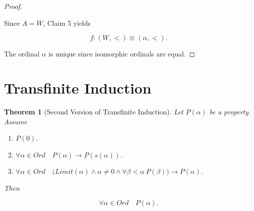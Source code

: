\documentclass[10pt,a4paper]{book}
\newtheorem{theorem}{Theorem}[section]
\begin{document}
\begin{proof}
\begin{fitchproof}[arrayenv=tabular]
        \open
         
         
         
         
        \close


    \end{fitchproof}

    Since $A=W$, Claim 5 yields

    \[
        f:(W,<)\cong(\alpha,<).
    \]

    The ordinal $\alpha$ is unique since isomorphic ordinals are equal.

\end{proof}

\section{Transfinite Induction}

\begin{theorem}[Second Version of Transfinite Induction]

    Let $P(\alpha)$ be a property. Assume

    \begin{enumerate}
        \setlength{\itemsep}{0pt}
        \item $P(0)$.
        \item $\forall \alpha\in Ord\quad P(\alpha)\to P(s(\alpha))$.
        \item $\forall \alpha\in Ord\quad
                  \big(
                  Limit(\alpha)\land \alpha\neq 0
                  \land
                  \forall \beta<\alpha\ P(\beta)
                  \big)
                  \to P(\alpha)$.
    \end{enumerate}

    Then

    \[
        \forall \alpha\in Ord\quad P(\alpha).
    \]

\end{theorem}
\end{document}
